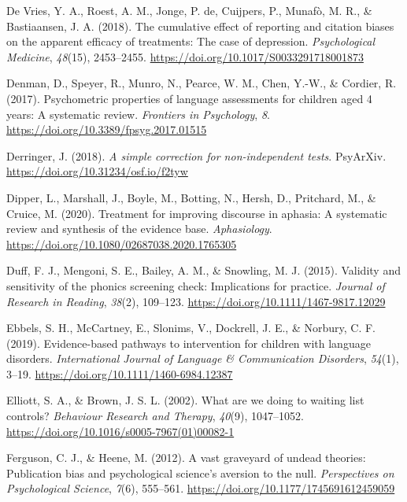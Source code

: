 \documentclass{krantz}
\newlength{\cslhangindent}
\newlength{\cslentryspacingunit} %
\newenvironment{CSLReferences}[2] %
{%
\setlength{\parindent}{0pt}
\ifodd #1
\let\oldpar\par
\def\par{\hangindent=\cslhangindent\oldpar}
\fi
\setlength{\parskip}{#2\cslentryspacingunit}
}%
{}
\begin{document}
\begin{CSLReferences}{1}{0}
\leavevmode{}%
De Vries, Y. A., Roest, A. M., Jonge, P. de, Cuijpers, P., Munafò, M. R., \& Bastiaansen, J. A. (2018). The cumulative effect of reporting and citation biases on the apparent efficacy of treatments: The case of depression. \emph{Psychological Medicine}, \emph{48}(15), 2453--2455. \url{https://doi.org/10.1017/S0033291718001873}

\leavevmode{}%
Denman, D., Speyer, R., Munro, N., Pearce, W. M., Chen, Y.-W., \& Cordier, R. (2017). Psychometric properties of language assessments for children aged 4 years: {A} systematic review. \emph{Frontiers in Psychology}, \emph{8}. \url{https://doi.org/10.3389/fpsyg.2017.01515}

\leavevmode{}%
Derringer, J. (2018). \emph{A simple correction for non-independent tests}. {PsyArXiv}. \url{https://doi.org/10.31234/osf.io/f2tyw}

\leavevmode{}%
Dipper, L., Marshall, J., Boyle, M., Botting, N., Hersh, D., Pritchard, M., \& Cruice, M. (2020). Treatment for improving discourse in aphasia: A systematic review and synthesis of the evidence base. \emph{Aphasiology}. \url{https://doi.org/10.1080/02687038.2020.1765305}

\leavevmode{}%
Duff, F. J., Mengoni, S. E., Bailey, A. M., \& Snowling, M. J. (2015). Validity and sensitivity of the phonics screening check: Implications for practice. \emph{Journal of Research in Reading}, \emph{38}(2), 109--123. \url{https://doi.org/10.1111/1467-9817.12029}

\leavevmode{}%
Ebbels, S. H., McCartney, E., Slonims, V., Dockrell, J. E., \& Norbury, C. F. (2019). Evidence-based pathways to intervention for children with language disorders. \emph{International Journal of Language \& Communication Disorders}, \emph{54}(1), 3--19. \url{https://doi.org/10.1111/1460-6984.12387}

\leavevmode{}%
Elliott, S. A., \& Brown, J. S. L. (2002). What are we doing to waiting list controls? \emph{Behaviour Research and Therapy}, \emph{40}(9), 1047--1052. \url{https://doi.org/10.1016/s0005-7967(01)00082-1}

\leavevmode{}%
Ferguson, C. J., \& Heene, M. (2012). A vast graveyard of undead theories: {Publication} bias and psychological science's aversion to the null. \emph{Perspectives on Psychological Science}, \emph{7}(6), 555--561. \url{https://doi.org/10.1177/1745691612459059}


\end{CSLReferences}
\end{document}
